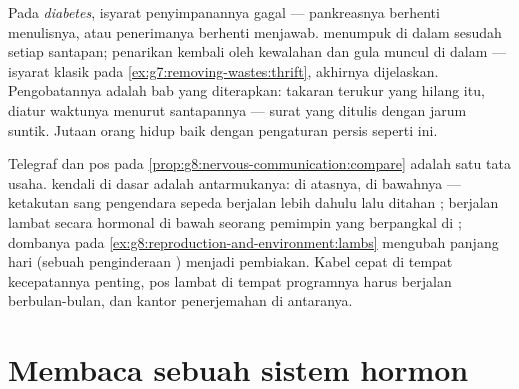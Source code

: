 \begin{example}\label{ex:g8:hormonal-communication:diabetes}
Pada \emph{diabetes}, isyarat 
penyimpanannya gagal --- pankreasnya berhenti menulisnya,
atau penerimanya berhenti menjawab.  menumpuk di
dalam  sesudah setiap santapan; penarikan kembali oleh
 kewalahan dan gula muncul di dalam  ---
isyarat klasik pada \cref{ex:g7:removing-wastes:thrift},
akhirnya dijelaskan. Pengobatannya adalah bab yang
diterapkan: takaran terukur  yang hilang itu, diatur
waktunya menurut santapannya --- surat yang ditulis dengan
jarum suntik. Jutaan orang hidup baik dengan pengaturan
persis seperti ini.
\end{example}

\begin{remark}\label{rem:g8:hormonal-communication:partnership}
Telegraf dan pos pada
\cref{prop:g8:nervous-communication:compare} adalah satu
tata usaha.  kendali di dasar  adalah
antarmukanya:  di atasnya,  di bawahnya
--- ketakutan sang pengendara sepeda berjalan  lebih
dahulu lalu ditahan ;  berjalan lambat secara
hormonal di bawah seorang pemimpin yang berpangkal di ;
dombanya pada \cref{ex:g8:reproduction-and-environment:lambs}
mengubah panjang hari (sebuah penginderaan ) menjadi
 pembiakan. Kabel cepat di tempat kecepatannya
penting, pos lambat di tempat programnya harus berjalan
berbulan-bulan, dan kantor penerjemahan di antaranya.
\end{remark}

\section{Membaca sebuah sistem hormon}

